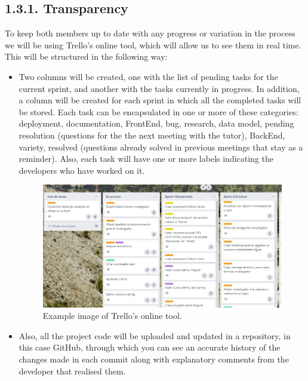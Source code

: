     \subsection*{1.3.1. Transparency}

    To keep both members up to date with any progress or variation in the process we will be using Trello's\cite{Trello} online tool, which will allow us to see them in real time. This will be structured in the following way:
    
    \begin{itemize}
    \item Two columns will be created, one with the list of pending tasks for the current sprint, and another with the tasks currently in progress. In addition, a column will be created for each sprint in which all the completed tasks will be stored. Each task can be encapsulated in one or more of these categories: deployment, documentation, FrontEnd, bug, research, data model, pending resolution (questions for the the next meeting with the tutor), BackEnd, variety, resolved (questions already solved in previous meetings that stay as a reminder). Also, each task will have one or more labels indicating the developers who have worked on it.\newline

    
     \begin{figure}[h]
    \centering
     \includegraphics[width=1\textwidth]{images/Trello.jpg}
    \caption{Example image of Trello's online tool.}
    \end{figure}
    \newpage
    
    \item  Also, all the project code will be uploaded and updated in a repository, in this case GitHub\cite{github}, through which you can see an accurate history of the changes made in each commit along with explanatory comments from the developer that realised them.\newline


\end{itemize}
